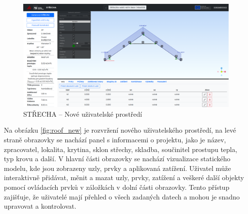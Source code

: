 \begin{figure}[H]
    \includegraphics{assets/figures/wbapp/strecha_new.png}
    \caption{STŘECHA -- Nové uživatelské prostředí}
    \label{fig:roof_new}
\end{figure}

Na obrázku \autoref{fig:roof_new} je rozvržení nového uživatelského prostředí, na levé straně obrazovky se nachází panel s informacemi o projektu, jako je název, zpracovatel, lokalita, krytina, sklon střechy, skladba, součinitel prostupu tepla, typ krovu a další. V hlavní části obrazovky se nachází vizualizace statického modelu, kde jsou zobrazeny uzly, prvky a aplikovaná zatížení. Uživatel může interaktivně přidávat, měnit a mazat uzly, prvky, zatížení a veškeré další objekty pomocí ovládacích prvků v záložkách v dolní části obrazovky. Tento přístup zajišťuje, že uživatelé mají přehled o všech zadaných datech a mohou je snadno upravovat a kontrolovat.

